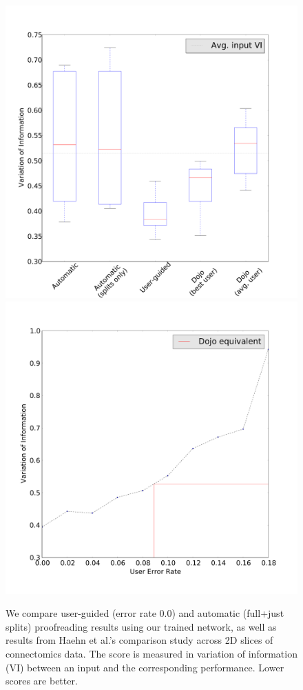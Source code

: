 \begin{figure}[t]
\centering
\includegraphics[scale=.1]{gfx/results_new.pdf}
\includegraphics[scale=.1]{gfx/user_error_rate.pdf}
\caption{We compare user-guided (error rate 0.0) and automatic (full+just splits) proofreading results using our trained network,  as well as results from Haehn et al.'s comparison study \cite{haehn_dojo_2014} across 2D slices of connectomics data. The score is measured in variation of information (VI) between an input and the corresponding performance. Lower scores are better.}
\label{fig:results}
\end{figure}
